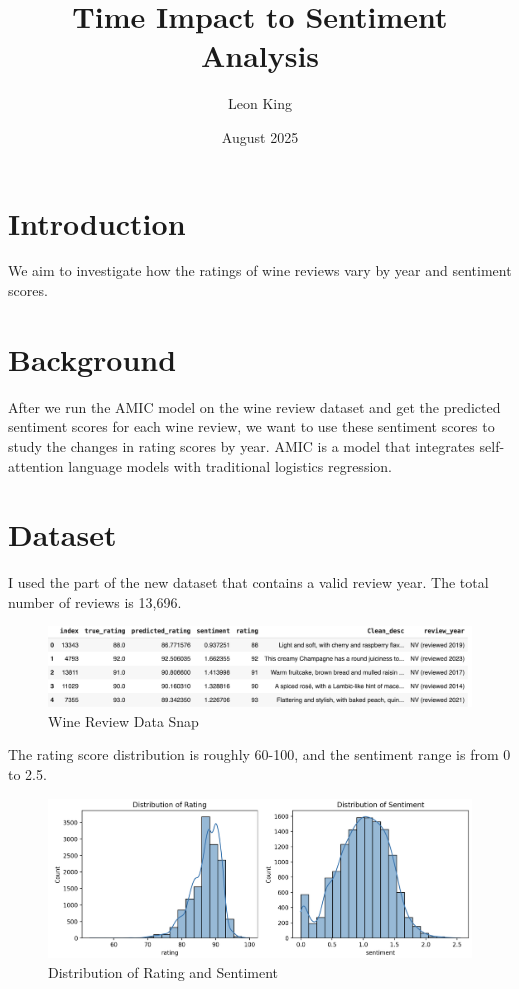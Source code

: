 \documentclass{article}
\title{Time Impact to Sentiment Analysis}
\author{Leon King}
\date{August 2025}
\begin{document}
\maketitle

\section{Introduction}
We aim to investigate how the ratings of wine reviews vary by year and sentiment scores. 

\section{Background}
After we run the AMIC model on the wine review dataset and get the predicted sentiment scores for each wine review, we want to use these sentiment scores to study the changes in rating scores by year. AMIC is a model that integrates self-attention language models with traditional logistics regression. 

\section{Dataset}
I used the part of the new dataset that contains a valid review year. The total number of reviews is 13,696.
\begin{figure}[!ht]
    \centering
    \includegraphics[width=1.0\linewidth]{wine_data.png}
    \caption{Wine Review Data Snap}
    \label{fig:placeholder}
\end{figure}

The rating score distribution is roughly 60-100, and the sentiment range is from 0 to 2.5.
\begin{figure}[!ht]
    \centering
    \includegraphics[width=0.75\linewidth]{distribution.png}
    \caption{Distribution of Rating and Sentiment}
    \label{fig:placeholder}
\end{figure}
\end{document}
